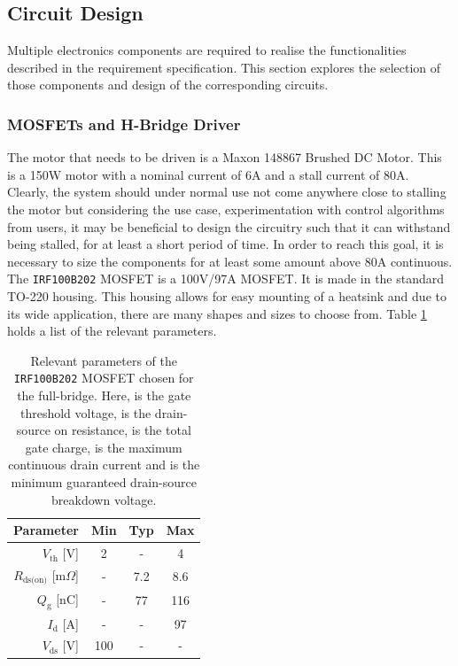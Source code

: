 \subsection{Circuit Design}
\label{sub:controller_board_circuit_design}

Multiple electronics components are required to realise the functionalities described in the requirement specification.
This section explores the selection of those components and design of the corresponding circuits.

\subsubsection{MOSFETs and H-Bridge Driver} %
\label{ssub:h_bridge}
The motor that needs to be driven is a Maxon 148867 Brushed DC Motor.
This is a 150W motor with a nominal current of 6A and a stall current of 80A.
Clearly, the system should under normal use not come anywhere close to stalling the motor but considering the use case, experimentation with control algorithms from users, it may be beneficial to design the circuitry such that it can withstand being stalled, for at least a short period of time.
In order to reach this goal, it is necessary to size the components for at least some amount above 80A continuous.
The \texttt{IRF100B202} MOSFET \cite{mosfet} is a 100V/97A MOSFET.
It is made in the standard TO-220 housing.
This housing allows for easy mounting of a heatsink and due to its wide application, there are many shapes and sizes to choose from.
Table \ref{tab:mosfetparameters} holds a list of the relevant parameters.

\begin{table}[h]
	\centering
	\begin{tabular}{|r|c|c|c|}
	\hline
		\textbf{Parameter} & \textbf{Min} & \textbf{Typ} & \textbf{Max} \\
	\hline
		$V_{\text{th}}$ [V] & 2 & - & 4 \\
	\hline
		$R_{\text{ds(on)}}$ [m$\Omega$]& - & 7.2 & 8.6 \\
	\hline
		$Q_\text{g}$ [nC] & - & 77 & 116 \\
	\hline
		$I_\text{d}$ [A] & - & - & 97 \\
	\hline
		$V_{\text{ds}}$ [V] & 100 & - & - \\
	\hline
	\end{tabular}
	\caption[Relevant parameters of the \texttt{IRF100B202} MOSFET.]{Relevant parameters of the \texttt{IRF100B202} MOSFET \cite{mosfet} chosen for the full-bridge.
	Here, \vth is the gate threshold voltage, \ron is the drain-source on resistance, \qg is the total gate charge, \id is the maximum continuous drain current and \vds is the minimum guaranteed drain-source breakdown voltage.}
	\label{tab:mosfetparameters}
\end{table}

